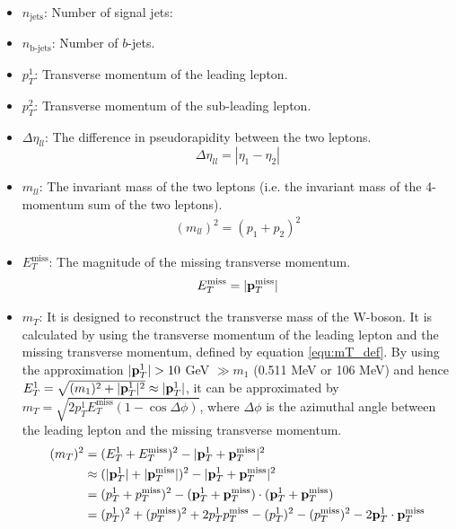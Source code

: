 \begin{itemize}
\item $n_{\text{jets}}$: Number of signal jets:
\item $n_{\text{b-jets}}$: Number of $b$-jets.
\item $p_T^1$: Transverse momentum of the leading lepton.
\item $p_T^2$: Transverse momentum of the sub-leading lepton.
\item $\Delta \eta_{ll}$:
The difference in pseudorapidity between the two leptons.
\begin{equation}
\Delta \eta_{ll} = |\eta_{1} - \eta_{2}|
\end{equation}
\item $m_{ll}$:
The invariant mass of the two leptons (i.e. the invariant mass of the 4-momentum sum of the two leptons).
\begin{align}
(m_{ll})^2 = (p_1 + p_2)^2
\end{align}
\item $E_{T}^{\text{miss}}$:
The magnitude of the missing transverse momentum.
\begin{equation}
E_{T}^{\text{miss}} = |{\bf p}_T^{\text{miss}}|
\end{equation}
\item $m_T$:
It is designed to reconstruct the transverse mass of the W-boson.
It is calculated by using the transverse momentum of the leading lepton and the missing transverse momentum, defined by equation \ref{equ:mT_def}.
By using the approximation $|{\bf p}_T^1| > 10$ GeV $\gg m_1$ (0.511 MeV or 106 MeV) and hence $E_T^1 = \sqrt{ (m_1)^2 + |{\bf p}_T^1|^2 } \approx |{\bf p}_T^1| $, it can be approximated by $m_T = \sqrt{2p_T^1 E_T^{\text{miss}}(1-\cos{\Delta\phi})}$, where $\Delta\phi$ is the azimuthal angle between the leading lepton and the missing transverse momentum.
\begin{align}
(m_T)^2 &= ( E_T^1 + E_T^{\text{miss}} )^2 - |{\bf p}_T^1 + {\bf p}_T^{\text{miss}}|^2 \label{equ:mT_def}\\
& \approx (|{\bf p}_T^1| + |{\bf p}_T^{\text{miss}}|)^2 - |{\bf p}_T^1 + {\bf p}_T^{\text{miss}}|^2 \\
&= (p_T^1 +  p_T^{\text{miss}})^2 - ({\bf p}_T^1 + {\bf p}_T^{\text{miss}}) \cdot ({\bf p}_T^1 + {\bf p}_T^{\text{miss}}) \\
&= (p_T^1)^2 + (p_T^{\text{miss}})^2 + 2 p_T^1 p_T^{\text{miss}}
 - (p_T^1)^2 - (p_T^{\text{miss}})^2 - 2 {\bf p}_T^1  \cdot {\bf p}_T^{\text{miss}} \\

\end{align}
\end{itemize}
